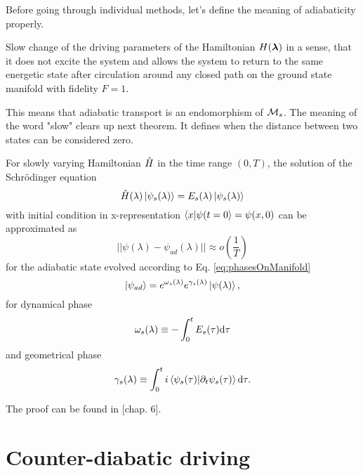 Before going through individual methods, let's define the meaning of adiabaticity properly.

\begin{definition}[Adibaticity]
    Slow change of the driving parameters of the Hamiltonian $H({\bm\lambda})$ in a sense, that it does not excite the system and allows the system to return to the same energetic state after circulation around any closed path on the ground state manifold with fidelity $F=1$. 
\end{definition}
This means that adiabatic transport is an endomorphism of $\mathcal{M} _s$. The meaning of the word "slow" clears up next theorem. It defines when the distance between two states can be considered zero.
\begin{thm}
    \label{adiabaticTheorem}
    For slowly varying Hamiltonian $\hat{H}$ in the time range $(0,T)$, the solution of the Schrödinger equation 
    $$\hat{H}(\lambda)\ket{\psi_s(\lambda)} = E_s(\lambda)\ket{\psi_s(\lambda)}$$
    with initial condition in x-representation $\braket{x|\psi(t=0}=\psi(x,0)$ can be approximated as
    \begin{equation}
      ||\psi(\lambda) - \psi_{ad}(\lambda)||\approx o\left(\frac{1}{T}\right)
    \end{equation}
    for the adiabatic state evolved according to Eq. \ref{eq:phasesOnManifold}
    \begin{equation}
        \ket{\psi_{ad}}= e^{\omega_s(\lambda)}e^{\gamma_s(\lambda)}\ket{\psi(\lambda)},
    \end{equation}
    for dynamical phase
    $$\omega_s(\lambda)\equiv -\int_0^t E_s(\tau)\mathrm{d} \tau$$
    and geometrical phase
        $$\gamma_s(\lambda)\equiv \int_0^t i\braket{\psi_s(\tau)|\partial_t\psi_s(\tau)} \mathrm{d} \tau .$$
\end{thm}
\begin{myproof}
    The proof can be found in \cite{sakurai}[chap. 6].
\end{myproof}














\section{Counter-diabatic driving}

